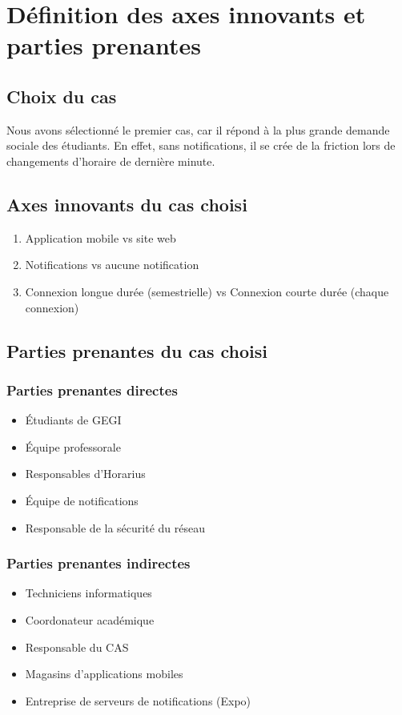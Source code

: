 \section{Définition des axes innovants et parties prenantes}
	\subsection{Choix du cas}
	Nous avons sélectionné le premier cas, car il répond à la plus grande demande sociale des étudiants. En effet, sans notifications, il se crée de la friction lors de changements d'horaire de dernière minute.
	
	\subsection{Axes innovants du cas choisi}
	\begin{enumerate}
		\item Application mobile vs site web
		\item Notifications vs aucune notification
		\item Connexion longue durée (semestrielle) vs Connexion courte durée (chaque connexion)
	\end{enumerate}
	
	\subsection{Parties prenantes du cas choisi}
		\subsubsection{Parties prenantes directes}
		\begin{itemize}
			\item Étudiants de GEGI
			\item Équipe professorale
			\item Responsables d'Horarius
			\item Équipe de notifications
			\item Responsable de la sécurité du réseau
		\end{itemize}
		
		\subsubsection{Parties prenantes indirectes}
		\begin{itemize}
			\item Techniciens informatiques
			\item Coordonateur académique
			\item Responsable du CAS
			\item Magasins d'applications mobiles
			\item Entreprise de serveurs de notifications (Expo)
		\end{itemize}
	